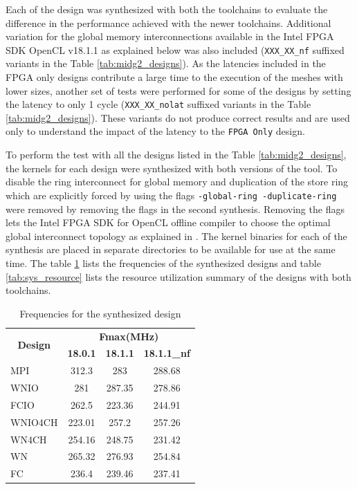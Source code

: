 Each of the design was synthesized with both the toolchains to evaluate the difference in the performance
achieved with the newer toolchains. Additional variation for the global memory interconnections available
in the Intel FPGA SDK OpenCL v18.1.1 as explained below was also included (\texttt{XXX\_XX\_nf}
suffixed variants in the Table \ref{tab:midg2_designs}).
As the latencies included in the FPGA only designs contribute
a large time to the execution of the meshes with lower sizes, another set of
tests were performed for some of the designs by setting the latency to only 1 cycle
(\texttt{XXX\_XX\_nolat} suffixed variants in the Table \ref{tab:midg2_designs}).
These variants do not produce correct results and are used only to understand the
impact of the latency to the \texttt{FPGA Only} design.

To perform the test with all the designs listed in the Table \ref{tab:midg2_designs},
the kernels for each design were synthesized with both versions of the tool. To disable
the ring interconnect for global memory and duplication of the store ring
which are explicitly forced by using the flags \texttt{-global-ring -duplicate-ring}
were removed by removing the flags in the second synthesis. Removing the flags
lets the Intel FPGA SDK for OpenCL offline compiler to choose the optimal global
interconnect topology as explained in \cite{noauthor_intel_2019_prog, section 7.16 and 7.17}.
The kernel binaries for each of the synthesis are placed in separate directories
to be available for use at the same time. The table \ref{tab:syn_freq} lists the
frequencies of the synthesized designs and table \ref{tab:sys_resource}
lists the resource utilization summary of the designs with both toolchains.

\begin{table}[ht]
    \centering
    \caption{Frequencies for the synthesized design }
    \label{tab:syn_freq}
    \begin{tabular}{lccc}
    \multicolumn{1}{c}{\multirow{2}{*}{\textbf{Design}}} & \multicolumn{3}{c}{\textbf{Fmax(MHz)}} \\
    \cline{2-4}
    \multicolumn{1}{c}{} & \textbf{18.0.1} & \textbf{18.1.1} & \textbf{18.1.1\_nf} \\
    \hline
    MPI & 312.3 & 283 & 288.68 \\
    WNIO & 281 & 287.35 & 278.86 \\
    FCIO & 262.5 & 223.36 & 244.91 \\
    WNIO4CH & 223.01 & 257.2 & 257.26 \\
    WN4CH & 254.16 & 248.75 & 231.42 \\
    WN & 265.32 & 276.93 & 254.84 \\
    FC & 236.4 & 239.46 & 237.41 \\
    \hline
    \end{tabular}%
\end{table}


